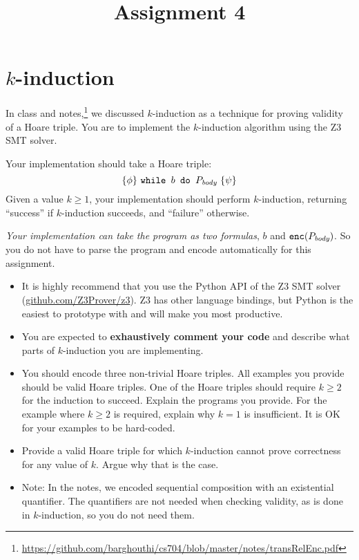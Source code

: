 \documentclass[11pt, oneside]{article}   	%
\title{Assignment 4}
\begin{document}
\maketitle

\section*{$k$-induction}
In class and notes,\footnote{\url{https://github.com/barghouthi/cs704/blob/master/notes/transRelEnc.pdf}}
 we discussed $k$-induction as a technique
for proving validity of a Hoare triple.
You are to implement the $k$-induction algorithm
using the Z3 SMT solver.


Your implementation should take a Hoare triple:
$$\{\phi\}\ \texttt{while } b \texttt{ do } P_\emph{body}\  \{\psi\}$$
Given a value $k \geq 1$,
your implementation should perform
$k$-induction, returning ``success'' if
$k$-induction succeeds, and ``failure'' otherwise.

\emph{Your implementation can take the program
as two formulas}, $b$ and $\texttt{enc}(P_{\emph{body}})$.
So you do not have to parse the program and encode automatically
for this assignment.

\begin{itemize}
  \item It is highly recommend that you use the Python
  API of the Z3 SMT solver (\url{github.com/Z3Prover/z3}).
  Z3 has other language bindings, but Python is the easiest
  to prototype with and will make you most productive.

\item You are expected to \textbf{exhaustively comment your
code} and describe what parts of $k$-induction you are implementing.

\item You should encode three non-trivial Hoare triples.
All examples you provide should be valid Hoare triples.
One of the Hoare triples should require $k\geq2$
for the induction to succeed.
Explain the programs you provide.
For the example where $k\geq 2$ is required, explain why
$k=1$ is insufficient.
It is OK for your examples to be hard-coded.

\item Provide a valid Hoare triple
for which $k$-induction cannot prove correctness
for any value of $k$. Argue why that is the case.

\item Note: In the notes, we encoded sequential 
    composition with an existential quantifier.
    The quantifiers are not needed when 
    checking validity, as is done in $k$-induction,
    so you do not need them.
\end{itemize}
\end{document}
